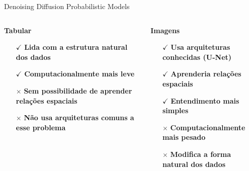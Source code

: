 \begin{frame}[c]{Denoising Diffusion Probabilistic Models}
    \begin{columns}[c]
        \begin{column}{0.46\linewidth}
            \begin{splusbox}{\textbf{Tabular}}
                \begin{itemize}
                    \item[$\checkmark$] \textbf{Lida com a estrutura natural dos dados}
                    \item[$\checkmark$] \textbf{Computacionalmente mais leve}
                    \item[$\times$] \textbf{Sem possibilidade de aprender relações espaciais}
                    \item[$\times$] \textbf{Não usa arquiteturas comuns a esse problema}
                \end{itemize}
            \end{splusbox}
        \end{column}
        \begin{column}{0.46\linewidth}
            \begin{splusbox}{\textbf{Imagens}}
                \begin{itemize}
                    \item[$\checkmark$] \textbf{Usa arquiteturas conhecidas (U-Net)}
                    \item[$\checkmark$] \textbf{Aprenderia relações espaciais}
                    \item[$\checkmark$] \textbf{Entendimento mais simples}
                    \item[$\times$] \textbf{Computacionalmente mais pesado}
                    \item[$\times$] \textbf{Modifica a forma natural dos dados}
                \end{itemize}
            \end{splusbox}
        \end{column}
    \end{columns}
\end{frame}

